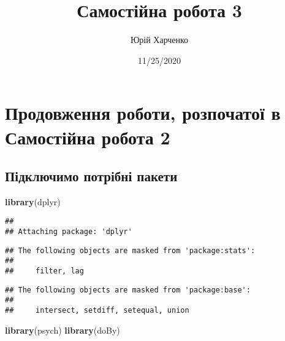 \documentclass[
]{article}
\title{Самостійна робота 3}
\author{Юрій Харченко}
\date{11/25/2020}
\newenvironment{Shaded}{\begin{snugshade}}{\end{snugshade}}
\newcommand{\KeywordTok}[1]{\textcolor[rgb]{0.13,0.29,0.53}{\textbf{#1}}}
\newcommand{\NormalTok}[1]{#1}
\begin{document}
\maketitle

\hypertarget{ux43fux440ux43eux434ux43eux432ux436ux435ux43dux43dux44f-ux440ux43eux431ux43eux442ux438-ux440ux43eux437ux43fux43eux447ux430ux442ux43eux457-ux432-ux441ux430ux43cux43eux441ux442ux456ux439ux43dux430-ux440ux43eux431ux43eux442ux430-2}{%
\section{Продовження роботи, розпочатої в Самостійна робота
2}\label{ux43fux440ux43eux434ux43eux432ux436ux435ux43dux43dux44f-ux440ux43eux431ux43eux442ux438-ux440ux43eux437ux43fux43eux447ux430ux442ux43eux457-ux432-ux441ux430ux43cux43eux441ux442ux456ux439ux43dux430-ux440ux43eux431ux43eux442ux430-2}}

\hypertarget{ux43fux456ux434ux43aux43bux44eux447ux438ux43cux43e-ux43fux43eux442ux440ux456ux431ux43dux456-ux43fux430ux43aux435ux442ux438}{%
\subsection{Підключимо потрібні
пакети}\label{ux43fux456ux434ux43aux43bux44eux447ux438ux43cux43e-ux43fux43eux442ux440ux456ux431ux43dux456-ux43fux430ux43aux435ux442ux438}}

\begin{Shaded}
\begin{Highlighting}[]
\KeywordTok{library}\NormalTok{(dplyr)}
\end{Highlighting}
\end{Shaded}

\begin{verbatim}
## 
## Attaching package: 'dplyr'
\end{verbatim}

\begin{verbatim}
## The following objects are masked from 'package:stats':
## 
##     filter, lag
\end{verbatim}

\begin{verbatim}
## The following objects are masked from 'package:base':
## 
##     intersect, setdiff, setequal, union
\end{verbatim}

\begin{Shaded}
\begin{Highlighting}[]
\KeywordTok{library}\NormalTok{(psych)}
\KeywordTok{library}\NormalTok{(doBy)}
\end{Highlighting}
\end{Shaded}
\end{document}
